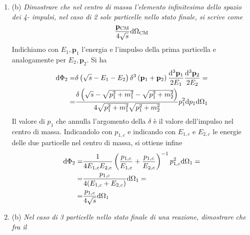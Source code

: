 \documentclass{article}
\renewcommand{\b}{(b)}
\renewcommand{\t}[1]{\textit{ #1}}
\renewcommand{\vec}[1]{\mathbf{#1}}
\begin{document}
\begin{enumerate}
{	particelle emergenti dopo la collisione di due particelle [oppure dopo il
	decadimento di una particella].} Si sa che $\d ^4p=\d p^0\d ^3\vec{p}$. Vogliamo integrare l'espressione data in $p^0$, ossia calcolare
	\[\int\delta\left((p^0)^2-|\vec{p}|^2-m^2\right)\theta(p^0)\d^3\vec{p}\d p^0\]
	L'argomento della $\delta$ si annulla per
	\[p^0=\pm\sqrt{|\vec{p}|^2+m^2}=\pm E\]
	ma la presenza di $\theta(p^0)$ annulla il contributo della radice negativa. Ricordando che
	\[\int\delta(f(x))\d x=\sum_{i}\frac{f(x_i)}{|f'(x_i)|}\]
	dove la somma è estesa agli zeri di $f$, si ottiene infine
	\[\int\delta\left((p^0)^2-|\vec{p}|^2-m^2\right)\theta(p^0)\d ^3\vec{p}\d p^0=\frac{\d ^3\vec{p}}{2E}\]
	L'elemento infinitesimo dello spazio dei 4-impulsi di $N$ particelle si scrive allora come
	\[\d \Phi_N=\delta^4\left(P-\sum_{i=1}^{N}p_i\right)\prod_{i=1}^{N}\delta\left((p_i^0)^2-|\vec{p}_i|^2-m_i^2\right)\d ^4p_i=\delta^4\left(P-\sum_{i=1}^{N}p_i\right)\prod_{i=1}^{N}\frac{\d ^3\vec{p}_i}{2E_i}\]
	dove $P$ è il 4-impulso totale del sistema.
\item\b\t{Dimostrare che nel centro di massa l’elemento infinitesimo dello spazio dei 4-
	impulsi, nel caso di 2 sole particelle nello stato finale, si scrive come
	\[\frac{\vec{p}_\mathrm{CM}}{4 \sqrt{s}}\d \Omega_\mathrm{CM}\]}
Indichiamo con $E_1,\vec{p}_1$ l'energia e l'impulso della prima particella e analogamente per $E_2,\vec{p}_2$. Si ha
\begin{align*}
	\d \Phi_2=&\delta\left(\sqrt{s}-E_1-E_2\right)\delta^3\left(\vec{p}_1+\vec{p}_2\right)\frac{\d ^3\vec{p}_1}{2E_1}\frac{\d ^3\vec{p}_2}{2E_2}=\\=&\frac{\delta\left(\sqrt{s}-\sqrt{{p}_1^2+m_1^2}-\sqrt{{p}_1^2+m_2^2}\right)}{4\sqrt{{p}_1^2+m_1^2}\sqrt{p_1^2+m_2^2}}p_1^2\d p_1\d \Omega_1\\
\end{align*}
Il valore di ${p}_1$ che annulla l'argomento della $\delta$ è il valore dell'impulso nel centro di massa. Indicandolo con $p_{1,c}$ e indicando con $E_{1,c}$ e $E_{2,c}$ le energie delle due particelle nel centro di massa, si ottiene infine
\begin{align*}
	\mathrm{d} \Phi_2=&\frac{1}{4E_{1,c}E_{2,c}}\left(\frac{p_{1,c}}{E_{1,c}}+\frac{p_{1,c}}{E_{2,c}}\right)^{-1}p_{1,c}^2\mathrm{d} \Omega_1=\\=&\frac{p_{1,c}}{4(E_{1,c}+E_{2,c})}\mathrm{d} \Omega_1=\\=&\frac{p_{1,c}}{4\sqrt{s}}\mathrm{d} \Omega_1
\end{align*}
\item\b\t{ Nel caso di 3 particelle nello stato finale di una reazione, dimostrare che fra il
}
\end{enumerate}
\end{document}
